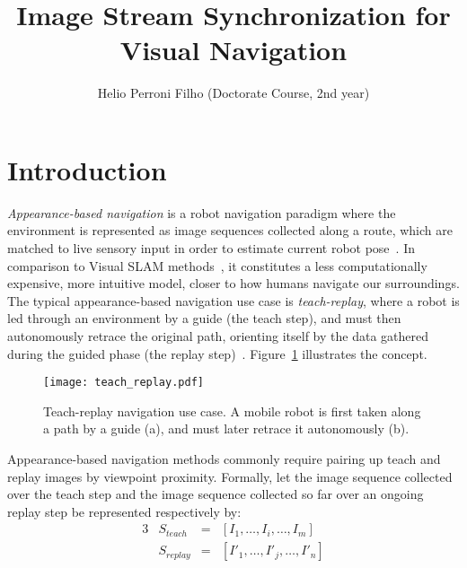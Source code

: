 \documentclass[twocolumn, 9pt,fleqn]{jsproceedings}
\title{Image Stream Synchronization for Visual Navigation}
\author{Helio Perroni Filho (Doctorate Course, 2nd year)\authorrefmark{1}}
\affiliation{Intelligent Robotics Laboratory, OHYA's group}
\begin{document}
\thispagestyle{myheadings}
\maketitle


\section{Introduction}

\textit{Appearance-based navigation} is a robot navigation paradigm where the environment is represented as image sequences collected along a route, which are matched to live sensory input in order to estimate current robot pose~\cite{BON02}. In comparison to Visual SLAM methods~\cite{AUL08}, it constitutes a less computationally expensive, more intuitive model, closer to how humans navigate our surroundings. The typical appearance-based navigation use case is \textit{teach-replay}, where a robot is led through an environment by a guide (the teach step), and must then autonomously retrace the original path, orienting itself by the data gathered during the guided phase (the replay step)~\cite{BUR01}. Figure~\ref{fig:teach_replay} illustrates the concept.

\begin{figure}[h!]
\vspace{20pt}
\texttt{[image: teach\_replay.pdf]}
\vspace{10pt}
\caption{Teach-replay navigation use case. A mobile robot is first taken along a path by a guide (a), and must later retrace it autonomously (b).}
\label{fig:teach_replay}
\end{figure}

Appearance-based navigation methods commonly require pairing up teach and replay images by viewpoint proximity. Formally, let the image sequence collected over the teach step and the image sequence collected so far over an ongoing replay step be represented respectively by:
\begin{alignat}{3}
& S_{teach} & = & [I_1, \dotsc, I_i, \dotsc, I_m] \\
& S_{replay} & = & [I'_1, \dotsc, I'_j, \dotsc, I'_n]
\end{alignat}
\end{document}

